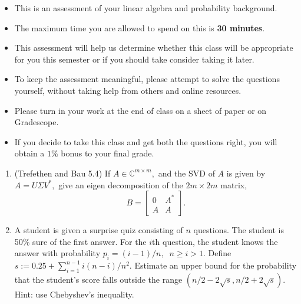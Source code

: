 \documentclass[12pt]{article}
\begin{document}
\MakeScribeTop

\begin{itemize}
	\item This is an assessment of your linear algebra and probability background.
	\item The maximum time you are allowed to spend on this is \textbf{30 minutes}.
	\item This assessment will help us determine whether this class will be appropriate for you this semester or if you should take consider taking it later.
	\item To keep the assessment meaningful, please attempt to solve the questions yourself, without taking help from others and online resources.
	\item Please turn in your work at the end of class on a sheet of paper or on Gradescope. 
	\item If you decide to take this class and get both the questions right, you will obtain a $1\%$ bonus to your final grade.
\end{itemize}
\vspace{1in}
\begin{enumerate}
	\item (Trefethen and Bau 5.4) If $A \in \mathbb{C}^{m\times m},$ and the SVD of $A$ is given by $A = U \Sigma V^*,$ give an eigen decomposition of the $2m \times 2m$ matrix,
		\begin{equation}
		B = \begin{bmatrix}
		0 & A^* \\
		A & A
		\end{bmatrix}.
		\end{equation}
	\item A student is given a surprise quiz consisting of $n$ questions. The student is 50\% sure of the first answer. For the $i$th question, the student knows the answer with probability $p_i = (i-1)/n,\;\; n \geq i > 1.$ Define $s := 0.25 + \sum_{i=1}^{n-1} i(n-i)/n^2.$ Estimate an upper bound for the probability that the student's score falls outside the range $(n/2 - 2\sqrt{s}, n/2 + 2\sqrt{s})$. Hint: use Chebyshev's inequality. 
\end{enumerate}



\end{document}
